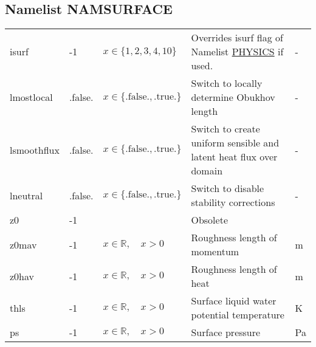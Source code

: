 \documentclass[twoside,11pt,fleqn,a4paper,english,openright]{report}
\begin{document}
\subsection{Namelist NAMSURFACE}\label{par:surface}
\begin{center}
  \tablelasttail{
        &&&&\\\hline
  }
\begin{supertabular}{|l|p{1.6cm}|p{4cm}|p{6cm}|l|}
  isurf	& -1	& $x \in \{1,2,3,4,10\}$	& Overrides isurf flag of Namelist \hyperref[par:physics]{PHYSICS} if used. & -\\
  lmostlocal	& .false.	& $x\in\{\text{.false.},\text{.true.}\}$	& Switch to locally determine Obukhov length& -\\
  lsmoothflux	& .false.	& $x\in\{\text{.false.},\text{.true.}\}$	& Switch to create uniform sensible and latent heat flux over domain& -\\
  lneutral	& .false.	& $x\in\{\text{.false.},\text{.true.}\}$	& Switch to disable stability corrections & -\\
  z0	& -1	& 	& Obsolete	& \\
  z0mav	& -1	& $x \in \mathbb{R}, \quad x>0$	& Roughness length of momentum	& m\\
  z0hav	& -1	& $x \in \mathbb{R}, \quad x>0$	& Roughness length of heat	& m\\
  thls	& -1	& $x \in \mathbb{R}, \quad x>0$	& Surface liquid water potential temperature & K\\
  ps	& -1	& $x \in \mathbb{R}, \quad x>0$	& Surface pressure & Pa\\

\end{supertabular}
\end{center}
\end{document}
